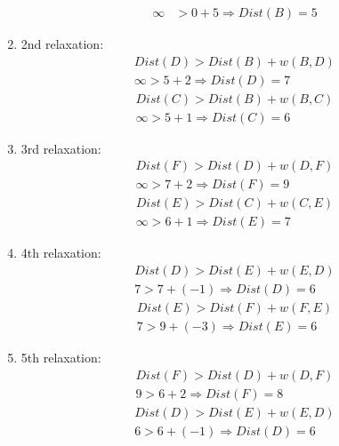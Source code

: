 \documentclass{article}
\begin{document}
\begin{multicols*}{2}
\begin{enumerate}
\begin{align*}
                  \infty  & > 0 + 5 \Rightarrow Dist(B) = 5
              \end{align*}
        \item 2nd relaxation:
              \begin{align*}
                  Dist(D) > Dist(B) + w(B, D) \\
                  \infty > 5 + 2 \Rightarrow Dist(D) = 7
              \end{align*}
              \begin{align*}
                  Dist(C) > Dist(B) + w(B, C) \\
                  \infty > 5 + 1 \Rightarrow Dist(C) = 6
              \end{align*}
        \item 3rd relaxation:
              \begin{align*}
                  Dist(F) > Dist(D) + w(D, F) \\
                  \infty > 7 + 2 \Rightarrow Dist(F) = 9
              \end{align*}
              \begin{align*}
                  Dist(E) > Dist(C) + w(C, E) \\
                  \infty > 6 + 1 \Rightarrow Dist(E) = 7
              \end{align*}
        \item 4th relaxation:
              \begin{align*}
                  Dist(D) > Dist(E) + w(E, D) \\
                  7 > 7 + (-1) \Rightarrow Dist(D) = 6
              \end{align*}
              \begin{align*}
                  Dist(E) > Dist(F) + w(F, E) \\
                  7 > 9 + (-3) \Rightarrow Dist(E) = 6
              \end{align*}
        \item 5th relaxation:
              \begin{align*}
                  Dist(F) > Dist(D) + w(D, F) \\
                  9 > 6 + 2 \Rightarrow Dist(F) = 8
              \end{align*}
              \begin{align*}
                  Dist(D) > Dist(E) + w(E, D) \\
                  6 > 6 + (-1) \Rightarrow Dist(D) = 6
              \end{align*}

\end{enumerate}
\end{multicols*}
\end{document}
